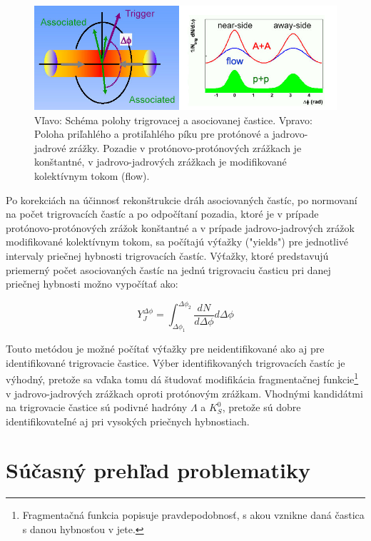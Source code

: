 \documentclass[thesismargins, thesislinespacing]{rnthesis}
\begin{document}
\begin{figure}[hbtp!]
	\begin{center}
		\includegraphics[width=\textwidth]{./Obrazky_praca/dijetcorrelations.png}
		\caption{Vľavo: Schéma polohy trigrovacej a asociovanej častice. Vpravo: Poloha priľahlého a protiľahlého píku pre protónové a jadrovo-jadrové zrážky. Pozadie v protónovo-protónových zrážkach je konštantné, v jadrovo-jadrových zrážkach je \-mo\-di\-fi\-ko\-va\-né kolektívnym tokom (flow).}
		\label{kor}
	\end{center}
\end{figure}

Po korekciách na účinnosť rekonštrukcie dráh asociovaných častíc, po normovaní na počet trigrovacích častíc a po odpočítaní pozadia, ktoré je v prípade protónovo-protónových zrážok konštantné a v prípade jadrovo-jadrových zrážok modifikované kolektívnym tokom, sa počítajú výťažky ("yields") pre jednotlivé intervaly priečnej hybnosti trigrovacích častíc. Výťažky, ktoré predstavujú priemerný počet asociovaných častíc na jednú trigrovaciu časticu pri danej priečnej hybnosti možno vypočítať ako:

\begin{equation}
Y_J^{\Delta\phi}=\int_{\Delta \phi_1}^{\Delta \phi_2} \frac{dN}{d\Delta \phi } d\Delta\phi 
\label{yield}
\end{equation} 

Touto metódou je možné počítať výťažky pre neidentifikované ako aj pre identifikované trigrovacie častice. Výber identifikovaných trigrovacích častíc je výhodný, pretože sa vďaka tomu dá študovať modifikácia fragmentačnej funkcie\footnote{Fragmentačná funkcia popisuje pravdepodobnosť, s akou vznikne daná častica s danou hybnosťou v jete.} v jadrovo-jadrových zrážkach oproti protónovým zrážkam. Vhodnými kandidátmi na trigrovacie častice sú podivné hadróny $\Lambda$ a $K^0_S$, pretože sú dobre identifikovateľné aj pri vysokých priečnych hybnostiach. 

\section{Súčasný prehľad problematiky}
\end{document}
